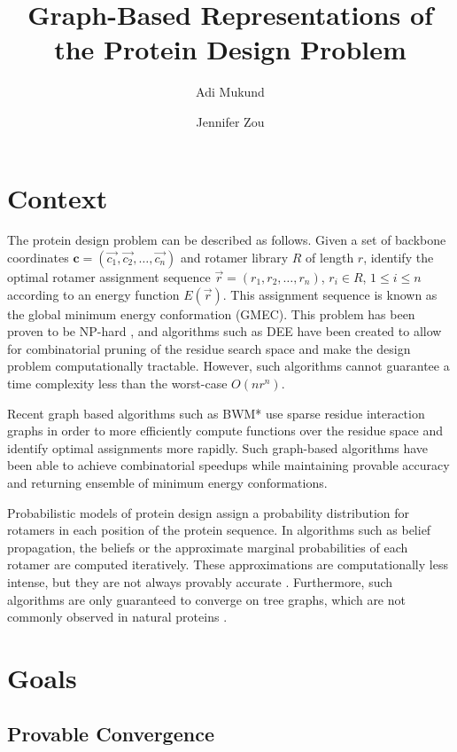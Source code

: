 \documentclass[11pt]{article}
\title{\textbf{Graph-Based Representations of the Protein Design Problem}}
\author{Adi Mukund \and Jennifer Zou}
\date{}
\begin{document}
	
	\maketitle	
	
	\section{Context}
	
	The protein design problem can be described as follows. Given a set of 
	backbone coordinates $\mathbf{c} = (\vec{c_1}, \vec{c_2 }, \dots, \vec{c_n})$
	and rotamer library $R$ of length $r$, identify the optimal rotamer
	assignment sequence $\vec{r} = (r_1, r_2,\dots, r_n)$, $r_i \in R$, 
	$1 \leq i \leq n$ according to an energy function $E(\vec{r})$. This assignment
	sequence is known as the global minimum energy conformation (GMEC). 
	This problem has been proven to be NP-hard \cite{PW02}, and algorithms such 
	as DEE \cite{BD97} have been created to allow for combinatorial pruning of 
	the residue search space and make the design problem computationally tractable.
	However, such algorithms cannot guarantee a time complexity less than the 
	worst-case $O(nr^n)$. 
	
	Recent graph based algorithms such as BWM* \cite{DJJG15} use sparse residue 
	interaction graphs in order to more efficiently compute functions over the residue
	space and identify optimal assignments more rapidly. Such graph-based algorithms
	have been able to achieve combinatorial speedups while maintaining provable
	accuracy and returning ensemble of minimum energy conformations. 
	
	Probabilistic models of protein design assign a probability distribution 
	for rotamers in each position of the protein sequence.  In algorithms such as
	belief propagation, the beliefs or the approximate marginal probabilities
	of each rotamer are computed iteratively.  These approximations are computationally
	less intense, but they are not always provably accurate \cite{KLX08}. Furthermore,
	such algorithms are only guaranteed to converge on tree graphs, which are not
	commonly observed in natural proteins \cite{FLY09}. 
	
	\section{Goals}
	
	\subsection{Provable Convergence}
	
\end{document}
